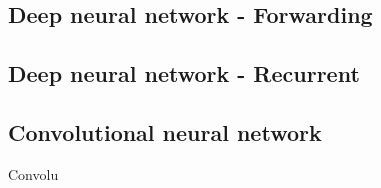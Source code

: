 \subsection{Deep neural network - Forwarding}
\subsection{Deep neural network - Recurrent}
\subsection{Convolutional neural network}
Convolu